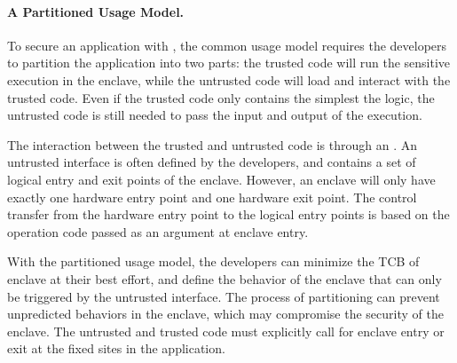 \paragraph{A Partitioned Usage Model.}
To secure an application with \sgx{},
the common usage model requires the developers to partition the application into two parts:
the trusted code will run the sensitive execution in the enclave,
while the untrusted code will load and interact with the trusted code.
Even if the trusted code only contains the simplest the logic,
the untrusted code is still needed to pass the input and output of the execution.

The interaction between the trusted and untrusted code is through an .
An untrusted interface is often defined by the developers, and contains a set of logical entry and exit points of the enclave.
However, an enclave will only have exactly one hardware entry point and one hardware exit point.
The control transfer from the hardware entry point to the logical entry points
is based on the operation code passed as an argument at enclave entry.

With the partitioned usage model,
the developers can minimize the TCB of enclave at their best effort,
and define the behavior of the enclave that can only be triggered by the untrusted interface.
The process of partitioning can prevent unpredicted behaviors in the enclave,
which may compromise the security of the enclave.
The untrusted and trusted code must explicitly call for enclave entry or exit
at the fixed sites in the application.






